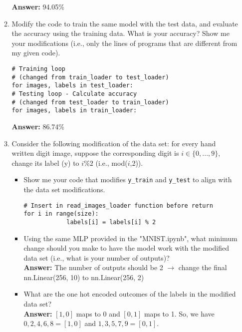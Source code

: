 \documentclass{assignment}
\begin{document}
\begin{problem}
\begin{enumerate}
\begin{enumerate}[label=(\alph*)]
        \color{blue}\textbf{Answer:} 
            94.05\%
        \color{black}


        
        \item Modify the code to train the same model with the test data, and evaluate the accuracy using the training data. What is your accuracy? Show me your modifications (i.e., only the lines of programs that are different from my given code).\color{blue}\begin{lstlisting}
# Training loop
# (changed from train_loader to test_loader)
for images, labels in test_loader:
# Testing loop - Calculate accuracy
# (changed from test_loader to train_loader)
for images, labels in train_loader:
            \end{lstlisting}
        \textbf{Answer:} 
            86.74\%
        \color{black}


        
        \item Consider the following modification of the data set: for every hand written digit image, suppose the corresponding digit is $i \in \{0,...,9\}$, change its label (y) to $i\%2$ (i.e., mod($i$,2)).

        \begin{itemize}
            \item Show me your code that modifies \texttt{y\_train} and \texttt{y\_test} to align with the data set modifications.\color{blue}\begin{lstlisting}
# Insert in read_images_loader function before return
for i in range(size):
            labels[i] = labels[i] % 2
                \end{lstlisting} \color{black}
            \item Using the same MLP provided in the "MNIST.ipynb", what minimum change should you make to have the model work with the modified data set (i.e., what is your number of outputs)?\\
                \color{blue}\textbf{Answer:} 
                    The number of outputs should be 2 $\rightarrow$ change the final nn.Linear(256, 10) to nn.Linear(256, 2)
                \color{black}
            \item What are the one hot encoded outcomes of the labels in the modified data set?\\
                \color{blue}\textbf{Answer:} 
                    $[1, 0]$ maps to 0 and $[0, 1]$ maps to 1. So, we have $0, 2, 4, 6, 8 = [1, 0]$ and $1, 3, 5, 7, 9 = [0, 1]$.
                \color{black}
        \end{itemize}


\end{enumerate}
\end{enumerate}
\end{problem}
\end{document}
